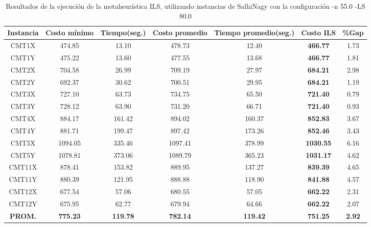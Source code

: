 \begin{table}[ht]
\caption{Resultados de la ejecución de la metaheurística ILS, utilizando instancias de SalhiNagy con la configuración -n 55.0 -LS 80.0}
\centering
\small
\begin{tabular}{c c c c c c c}
\hline\hline
Instancia & Costo mínimo & Tiempo(seg.) & Costo promedio & Tiempo promedio(seg.) & Costo ILS & \%Gap \\ [0.5ex]
\hline
CMT1X & 474.85 & 13.10 & 
478.73 & 12.40 & \bf{466.77} & 
1.73\\CMT1Y & 475.22 & 13.60 & 
477.55 & 13.68 & \bf{466.77} & 
1.81\\CMT2X & 704.58 & 26.99 & 
709.19 & 27.97 & \bf{684.21} & 
2.98\\CMT2Y & 692.37 & 30.62 & 
700.51 & 29.95 & \bf{684.21} & 
1.19\\CMT3X & 727.10 & 63.73 & 
734.75 & 65.50 & \bf{721.40} & 
0.79\\CMT3Y & 728.12 & 63.90 & 
731.20 & 66.71 & \bf{721.40} & 
0.93\\CMT4X & 884.17 & 161.42 & 
894.02 & 160.37 & \bf{852.83} & 
3.67\\CMT4Y & 881.71 & 199.47 & 
897.42 & 173.26 & \bf{852.46} & 
3.43\\CMT5X & 1094.05 & 335.46 & 
1097.41 & 378.99 & \bf{1030.55} & 
6.16\\CMT5Y & 1078.81 & 373.06 & 
1089.79 & 365.23 & \bf{1031.17} & 
4.62\\CMT11X & 878.41 & 153.82 & 
889.95 & 137.27 & \bf{839.39} & 
4.65\\CMT11Y & 880.39 & 121.95 & 
888.88 & 118.90 & \bf{841.88} & 
4.57\\CMT12X & 677.54 & 57.06 & 
680.55 & 57.05 & \bf{662.22} & 
2.31\\CMT12Y & 675.95 & 62.77 & 
679.94 & 64.66 & \bf{662.22} & 
2.07\\\bf{PROM.} & 
\bf{775.23} & \bf{119.78} & \bf{782.14} & \bf{119.42} & \bf{751.25} & \bf{2.92}\\[1ex]\hline
\end{tabular}
\label{table:nonlin}
\end{table} \clearpage

